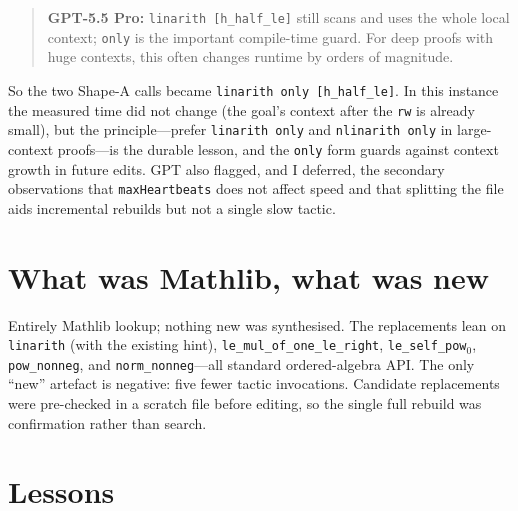 \documentclass[11pt]{article}
\newcommand{\gptbox}[1]{\par\medskip\begin{quote}\small\textbf{\textcolor{green!50!black}{GPT-5.5 Pro:}} #1\end{quote}\medskip}
\begin{document}
\gptbox{\texttt{linarith [h\_half\_le]} still scans and uses the whole local
context; \texttt{only} is the important compile-time guard. For deep proofs with
huge contexts, this often changes runtime by orders of magnitude.}

\noindent So the two Shape-A calls became \texttt{linarith only [h\_half\_le]}.
In this instance the measured time did not change (the goal's context after the
\texttt{rw} is already small), but the principle---prefer \texttt{linarith only}
and \texttt{nlinarith only} in large-context proofs---is the durable lesson, and
the \texttt{only} form guards against context growth in future edits. GPT also
flagged, and I deferred, the secondary observations that \texttt{maxHeartbeats}
does not affect speed and that splitting the file aids incremental rebuilds but
not a single slow tactic.

\section{What was Mathlib, what was new}

Entirely Mathlib lookup; nothing new was synthesised. The replacements lean on
\texttt{linarith} (with the existing hint), \texttt{le\_mul\_of\_one\_le\_right},
\texttt{le\_self\_pow$_0$}, \texttt{pow\_nonneg}, and \texttt{norm\_nonneg}---all
standard ordered-algebra API. The only ``new'' artefact is negative: five fewer
tactic invocations. Candidate replacements were pre-checked in a scratch file
before editing, so the single full rebuild was confirmation rather than search.

\section{Lessons}
\end{document}
